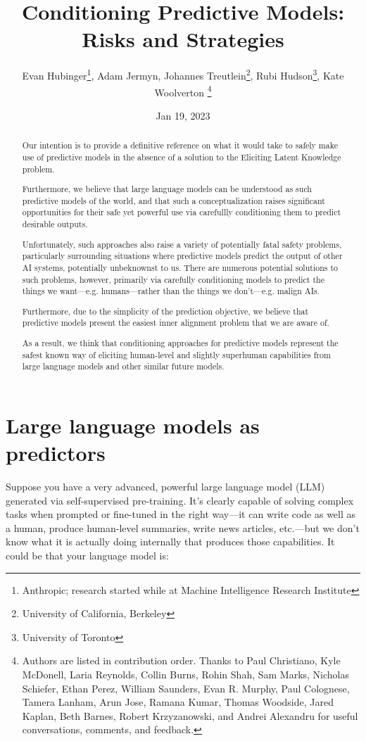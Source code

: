 \documentclass[
  twocolumn,
  natbib,
]{miri-tech-article}
\title{Conditioning Predictive Models: Risks and Strategies}
\author{
Evan Hubinger\thanks{Anthropic; research started while at Machine Intelligence Research Institute},
Adam Jermyn,
Johannes Treutlein\thanks{University of California, Berkeley},
Rubi Hudson\thanks{University of Toronto},
Kate Woolverton
\thanks{Authors are listed in contribution order. Thanks to Paul Christiano, Kyle McDonell, Laria Reynolds, Collin Burns, Rohin Shah, Sam Marks, Nicholas Schiefer, Ethan Perez, William Saunders, Evan R. Murphy, Paul Colognese, Tamera Lanham, Arun Jose, Ramana Kumar, Thomas Woodside, Jared Kaplan, Beth Barnes, Robert Krzyzanowski, and Andrei Alexandru for useful conversations, comments, and feedback.}}
\date{Jan 19, 2023}
\begin{document}
\maketitle

\begin{abstract}
    Our intention is to provide a definitive reference on what it would take to safely make use of predictive models in the absence of a solution to the Eliciting Latent Knowledge\cite{elk} problem.

    Furthermore, we believe that large language models can be understood as such predictive models of the world, and that such a conceptualization raises significant opportunities for their safe yet powerful use via carefullly conditioning them to predict desirable outputs.

    Unfortunately, such approaches also raise a variety of potentially fatal safety problems, particularly surrounding situations where predictive models predict the output of other AI systems, potentially unbeknownst to us. There are numerous potential solutions to such problems, however, primarily via carefully conditioning models to predict the things we want---e.g. humans---rather than the things we don't---e.g. malign AIs.

    Furthermore, due to the simplicity of the prediction objective, we believe that predictive models present the easiest inner alignment\cite{risks} problem that we are aware of.

    As a result, we think that conditioning approaches for predictive models represent the safest known way of eliciting human-level and slightly superhuman capabilities from large language models and other similar future models.
\end{abstract}




\section{Large language models as predictors}
\label{sec:1}

Suppose you have a very advanced, powerful large language model (LLM) generated via self-supervised pre-training. It's clearly capable of solving complex tasks when prompted or fine-tuned in the right way---it can write code as well as a human, produce human-level summaries, write news articles, etc.---but we don't know what it is actually doing internally that produces those capabilities. It could be that your language model is:
\end{document}
